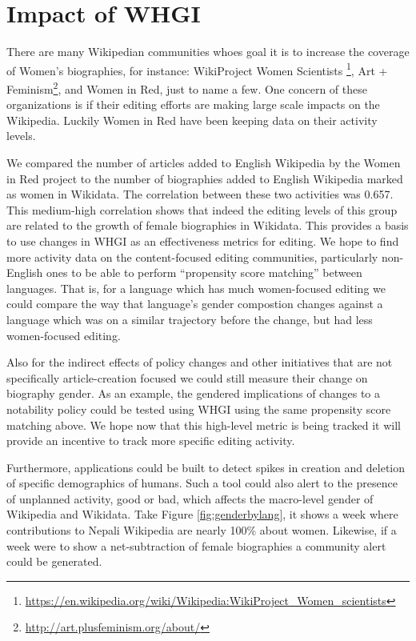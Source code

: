 \documentclass{sig-alternate-05-2015}
\begin{document}
\section{Impact of WHGI}

There are many Wikipedian communities whoes goal it is to increase the coverage of Women's biographies, for instance: WikiProject Women Scientists \footnote{\url{https://en.wikipedia.org/wiki/Wikipedia:WikiProject_Women_scientists}}, Art + Feminism\footnote{\url{http://art.plusfeminism.org/about/}}, and Women in Red, just to name a few. One concern of these organizations is if their editing efforts are making large scale impacts on the Wikipedia. Luckily Women in Red have been keeping data on their activity levels.

We compared the number of articles added to English Wikipedia by the Women in Red project to the number of biographies added to English Wikipedia marked as women in Wikidata. The correlation between these two activities was 0.657. This medium-high correlation shows that indeed the editing levels of this group are related to the growth of female biographies in Wikidata. This provides a basis to use changes in WHGI as an effectiveness metrics for editing. We hope to find more activity data on the content-focused editing communities, particularly non-English ones to be able to perform ``propensity score matching'' between languages. That is, for a language which has much women-focused editing we could compare the way that language's gender compostion changes against a language which was on a similar trajectory before the change, but had less women-focused editing.

Also for the indirect effects of policy changes and other initiatives that are not specifically article-creation focused we could still measure their change on biography gender. As an example, the gendered implications of changes to a notability policy could be tested using WHGI using the same propensity score matching above. We hope now that this high-level metric is being tracked it will provide an incentive to track more specific editing activity.

Furthermore, applications could be built to detect spikes in creation and deletion of specific demographics of humans. Such a tool could also alert to the presence of unplanned activity, good or bad, which affects the macro-level gender of Wikipedia and Wikidata. Take Figure \ref{fig:genderbylang}, it shows a week where contributions to Nepali Wikipedia are nearly 100\% about women. Likewise, if a week were to show a net-subtraction of female biographies  a community alert could be generated.
\end{document}
